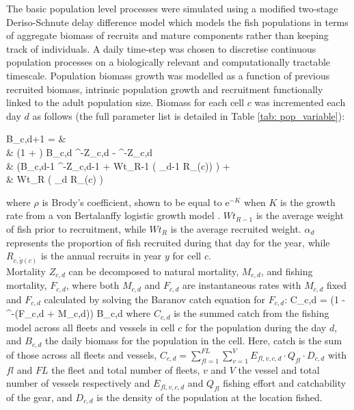 \documentclass[review]{elsarticle}
\let\oldequation\equation
\let\oldendequation\endequation
\renewenvironment{equation}
 {\linenomathNonumbers\oldequation}
 {\oldendequation\endlinenomath}
\begin{document}
The basic population level processes were simulated using a modified two-stage
Deriso-Schnute delay difference model which models the fish populations in
terms of aggregate biomass of recruits and mature components rather than
keeping track of individuals\citep{Deriso1980, Schnute1985, Dichmont2003}. A
daily time-step was chosen to discretise continuous population processes on a
biologically relevant and computationally tractable timescale. Population
biomass growth was modelled as a function of previous recruited biomass,
intrinsic population growth and recruitment functionally linked to the adult
population size.  Biomass for each cell $c$ was incremented each day $d$ as
follows (the full parameter list is detailed in Table \ref{tab: pop_variable}): 
\begin{equation}
	\begin{split}
	B_{c,d+1} = &\\
	& \left(1 + \rho \right) B_{c,d} \cdot {}^{-Z_{c,d}} - \rho \cdot
	^{-Z_{c,d}} \hspace{2.9cm}
	\times \\  
	& \left(B_{c,d-1} \cdot {}^{-Z_{c,d-1}} + Wt_{R-1} \cdot \left( \alpha_{d-1} \cdot
	R_{(c)}\right) \right)
	\hspace{0.9cm} + \\
	& Wt_{R} \cdot \left( \alpha_{d} \cdot R_{(c) \right)}
	\end{split}
\end{equation}
where $\rho$ is Brody's coefficient, shown to be equal to $\mathrm{e}^{-K}$
when $K$ is the growth rate from a von Bertalanffy logistic growth model
\citep{Schnute1985}. $Wt_{R-1}$ is the average weight of fish prior to
recruitment, while $Wt_{R}$ is the average recruited weight. $\alpha_{d}$
represents the proportion of fish recruited during that day for the year, while
$R_{c,\tilde{y}(c)}$ is the annual recruits in year $y$ for cell $c$. \\

Mortality $Z_{c,d}$ can be decomposed to natural mortality, $M_{c,d}$, and
fishing mortality, $F_{c,d}$, where both $M_{c,d}$ and $F_{c,d}$ are
instantaneous rates with $M_{c,d}$ fixed and $F_{c,d}$ calculated by solving
the Baranov catch equation \citep{Hilborn1992b} for $F_{c,d}$:
\begin{equation}
C_{c,d} =  \cdot \left(1 -
	^{-(F_{c,d} + M_{c,d})}\right) \cdot B_{c,d}
\end{equation}
where $C_{c,d}$ is the summed catch from the fishing model across all fleets
and vessels in cell $c$ for the population during the day $d$, and $B_{c,d}$
the daily biomass for the population in the cell. Here, catch is the sum of
those across all fleets and vessels, $C_{c, d} =
\sum\limits_{fl=1}^{FL}\sum\limits_{v=1}^{V} E_{fl, v, c, d} \cdot Q_{fl} \cdot
D_{c, d}$ with $fl$ and $FL$ the fleet and total number of fleets, $v$ and $V$
the vessel and total number of vessels respectively and $E_{fl,v,c,d}$ and
$Q_{fl}$ fishing effort and catchability of the gear, and $D_{c,d}$ is the
density of the population at the location fished. \\
\end{document}
